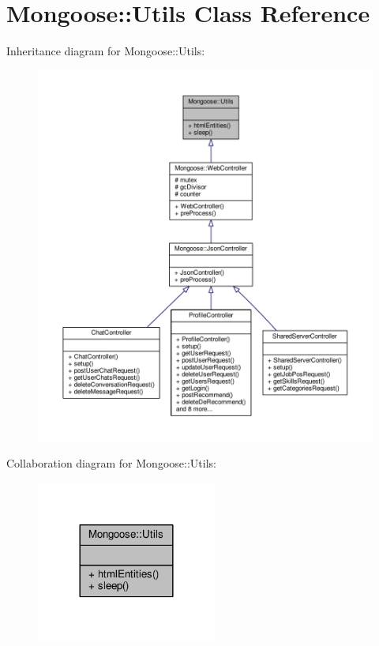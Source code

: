 \hypertarget{classMongoose_1_1Utils}{}\section{Mongoose\+:\+:Utils Class Reference}
\label{classMongoose_1_1Utils}


Inheritance diagram for Mongoose\+:\+:Utils\+:
\nopagebreak
\begin{figure}[H]
\begin{center}
\leavevmode
\includegraphics[width=350pt]{d1/df1/classMongoose_1_1Utils__inherit__graph}
\end{center}
\end{figure}


Collaboration diagram for Mongoose\+:\+:Utils\+:
\nopagebreak
\begin{figure}[H]
\begin{center}
\leavevmode
\includegraphics[width=168pt]{d1/d0b/classMongoose_1_1Utils__coll__graph}
\end{center}
\end{figure}
